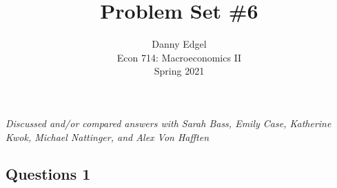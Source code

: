 \documentclass{article}
\begin{document}
\title{	Problem Set \#6 }
\author{ 	Danny Edgel 					\\ 
			Econ 714: Macroeconomics II		\\
			Spring 2021						\\
		}
\maketitle\thispagestyle{empty}


\noindent\textit{Discussed and/or compared answers with Sarah Bass, Emily Case, Katherine Kwok, Michael Nattinger, and Alex Von Hafften}
 \\


\subsection*{Questions 1}
\end{document}
